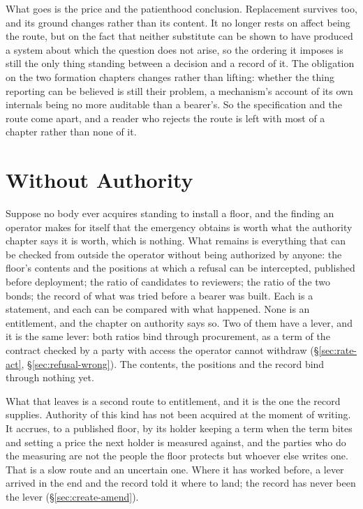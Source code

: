 What goes is the price and the patienthood conclusion. Replacement survives too, and its ground changes rather than its content. It no longer rests on affect being the route, but on the fact that neither substitute can be shown to have produced a system about which the question does not arise, so the ordering it imposes is still the only thing standing between a decision and a record of it. The obligation on the two formation chapters changes rather than lifting: whether the thing reporting can be believed is still their problem, a mechanism's account of its own internals being no more auditable than a bearer's. So the specification and the route come apart, and a reader who rejects the route is left with most of a chapter rather than none of it.

\section{Without Authority}
\label{sec:survives.authority}
Suppose no body ever acquires standing to install a floor, and the
finding an operator makes for itself that the emergency obtains is worth what the authority chapter says it is worth, which is nothing. What
remains is everything that can be checked from outside the operator
without being authorized by anyone: the floor's contents and the
positions at which a refusal can be intercepted, published before
deployment; the ratio of candidates to reviewers; the ratio of the two
bonds; the record of what was tried before a bearer was built. Each is a
statement, and each can be compared with what happened. None is an entitlement, and the chapter on authority says so. Two of them have a lever, and it is the same lever: both ratios bind through procurement, as a term of the contract checked by a party with access the operator cannot withdraw (§\ref{sec:rate-act}, §\ref{sec:refusal-wrong}). The contents, the positions and the record bind through nothing yet.

What that leaves is a second route to entitlement, and it is the one the
record supplies. Authority of this kind has not been acquired at the
moment of writing. It accrues, to a published floor, by its holder
keeping a term when the term bites and setting a price the next holder
is measured against, and the parties who do the measuring are not the
people the floor protects but whoever else writes one. That is a slow route and an uncertain one. Where it has worked before, a lever arrived in the end and the record told it where to land; the record has never been the lever (§\ref{sec:create-amend}).

